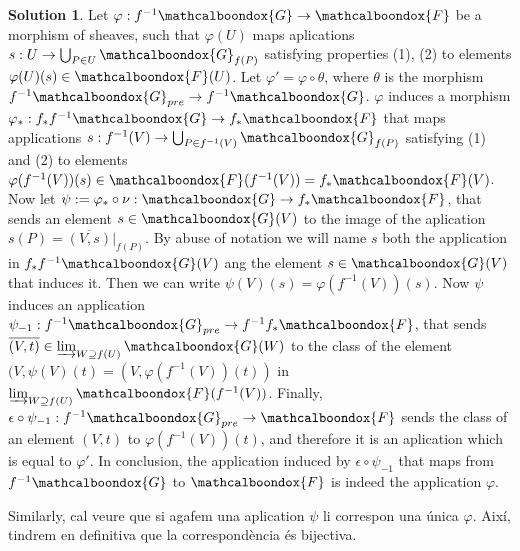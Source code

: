 \documentclass[12pt]{article}
\theoremstyle{definition}
\newtheorem*{sol}{Solution}
\newcommand{\sF}{\ensuremath{\mathcalboondox{F}}}
\newcommand{\sG}{\ensuremath{\mathcalboondox{G}}}
\begin{document}
\begin{sol}
	Let $\varphi: f^{-1}\sG \to \sF$ be a morphism of sheaves, such that $\varphi(U)$ maps aplications $s: U \to \bigcup_{P \in U} \sG_{f(P)}$ satisfying properties (1), (2) to elements $\varphi(U)(s) \in \sF(U)$. Let $\varphi' = \varphi \circ \theta$, where $\theta$ is the morphism $f^{-1}\sG_{pre} \to f^{-1}\sG$. $\varphi$ induces a morphism $\varphi_*: f_*f^{-1}\sG \to f_{*}\sF$ that maps applications $s: f^{-1}(V) \to \bigcup_{P \in f^{-1}(V)} \sG_{f(P)}$ satisfying (1) and (2) to elements $\varphi(f^{-1}(V))(s) \in \sF(f^{-1}(V)) = f_* \sF(V)$. Now let $\psi := \varphi_* \circ \nu : \sG \to f_* \sF$, that sends an element $s \in \sG(V)$ to the image of the aplication $s(P) = \overline{(V,s)}|_{f(P)}$. By abuse of notation we will name $s$ both the application in $f_*f^{-1}\sG(V)$ ang the element $s \in \sG(V)$ that induces it. Then we can write $\psi(V)(s) = \varphi(f^{-1}(V))(s)$. Now $\psi$ induces an application $\psi_{-1}: f^{-1}\sG_{pre} \to f^{-1}f_*\sF$, that sends $\overline{(V,t)} \in \varinjlim_{W \supseteq f(U)} \sG(W)$ to the class of the element $(V,\psi(V)(t) = (V, \varphi(f^{-1}(V))(t))$ in $\varinjlim_{W \supseteq f(U)} \sF(f^{-1}(V))$. Finally, $\epsilon \circ \psi_{-1}: f^{-1}\sG_{pre} \to \sF$ sends the class of an element $(V,t)$ to $\varphi(f^{-1}(V))(t)$, and therefore it is an aplication which is equal to $\varphi'$. In conclusion, the application induced by $\epsilon \circ \psi_{-1}$ that maps from $f^{-1}\sG$ to $\sF$ is indeed the application $\varphi$.

	Similarly, cal veure que si agafem una aplication $\psi$ li correspon una única $\varphi$. Així, tindrem en definitiva que la correspondència és bijectiva. 





\end{sol}
\end{document}
